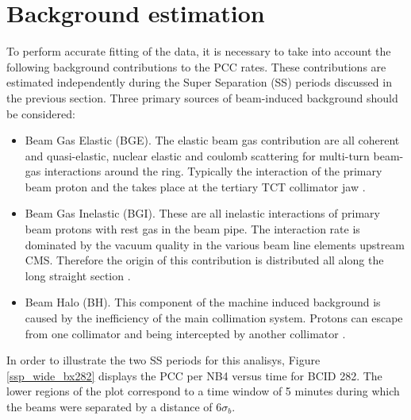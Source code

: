 \section{Background estimation}
\label{bkg}
To perform accurate fitting of the data, it is necessary to take into account the following background contributions to the PCC rates. These contributions are estimated independently during the Super Separation (SS) periods discussed in the previous section. Three primary sources of beam-induced background should be considered:

\begin{itemize}

\item Beam Gas Elastic (BGE). The elastic beam gas contribution are all coherent and quasi-elastic, nuclear elastic and coulomb scattering for multi-turn beam-gas interactions around the ring. Typically the interaction of the primary beam proton and the takes place at the tertiary TCT collimator jaw \cite{bkg_source}.

\item Beam Gas Inelastic (BGI). These are all inelastic interactions of primary beam protons with rest gas in the beam pipe. The interaction rate is dominated by the vacuum quality in the various beam line elements upstream CMS. Therefore the origin of this contribution is distributed all along the long straight section \cite{bkg_source}.

\item Beam Halo (BH). This component of the machine induced background is caused by the inefficiency of the main collimation system. Protons can escape from one collimator and being intercepted by another collimator \cite{bkg_source}.
\end{itemize}

In order to illustrate the two SS periods for this analisys, Figure \ref{ssp_wide_bx282} displays the PCC per NB4 versus time for BCID 282. The lower regions of the plot correspond to a time window of 5 minutes during which the beams were separated by a distance of $6\sigma_{b}$.\\


